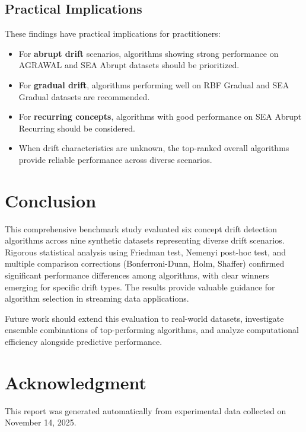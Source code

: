 \documentclass[conference]{IEEEtran}
\begin{document}
\subsection{Practical Implications}

These findings have practical implications for practitioners:

\begin{itemize}
\item For \textbf{abrupt drift} scenarios, algorithms showing strong performance on AGRAWAL and SEA Abrupt datasets should be prioritized.
\item For \textbf{gradual drift}, algorithms performing well on RBF Gradual and SEA Gradual datasets are recommended.
\item For \textbf{recurring concepts}, algorithms with good performance on SEA Abrupt Recurring should be considered.
\item When drift characteristics are unknown, the top-ranked overall algorithms provide reliable performance across diverse scenarios.
\end{itemize}

\section{Conclusion}

This comprehensive benchmark study evaluated six concept drift detection algorithms across nine synthetic datasets representing diverse drift scenarios. Rigorous statistical analysis using Friedman test, Nemenyi post-hoc test, and multiple comparison corrections (Bonferroni-Dunn, Holm, Shaffer) confirmed significant performance differences among algorithms, with clear winners emerging for specific drift types. The results provide valuable guidance for algorithm selection in streaming data applications.

Future work should extend this evaluation to real-world datasets, investigate ensemble combinations of top-performing algorithms, and analyze computational efficiency alongside predictive performance.

\section*{Acknowledgment}

This report was generated automatically from experimental data collected on November 14, 2025.
\end{document}
